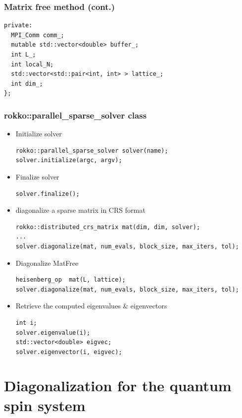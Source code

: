 \begin{frame}[c,fragile]
  \frametitle{Matrix free method (cont.)}
\begin{lstlisting}
private:
  MPI_Comm comm_;
  mutable std::vector<double> buffer_;
  int L_;
  int local_N;
  std::vector<std::pair<int, int> > lattice_;
  int dim_;
};
\end{lstlisting}
\end{frame}


\begin{frame}[c,fragile]
  \frametitle{rokko::parallel_sparse_solver class}
\vspace{-1\baselineskip}
  \begin{itemize}
  \item Initialize solver
\begin{lstlisting}
rokko::parallel_sparse_solver solver(name);
solver.initialize(argc, argv);
\end{lstlisting}
  \item Finalize solver
\begin{lstlisting}
solver.finalize();
\end{lstlisting}
  \item diagonalize a sparse matrix in CRS format
\begin{lstlisting}
rokko::distributed_crs_matrix mat(dim, dim, solver);
...
solver.diagonalize(mat, num_evals, block_size, max_iters, tol);
\end{lstlisting}
  \item Diagonalize MatFree
\begin{lstlisting}
heisenberg_op  mat(L, lattice);
solver.diagonalize(mat, num_evals, block_size, max_iters, tol);
\end{lstlisting}
  \item Retrieve the computed eigenvalues \& eigenvectors
\begin{lstlisting}
int i;
solver.eigenvalue(i);
std::vector<double> eigvec;
solver.eigenvector(i, eigvec);
\end{lstlisting}
  \end{itemize}
\end{frame}



\section{Diagonalization for the quantum spin system}


